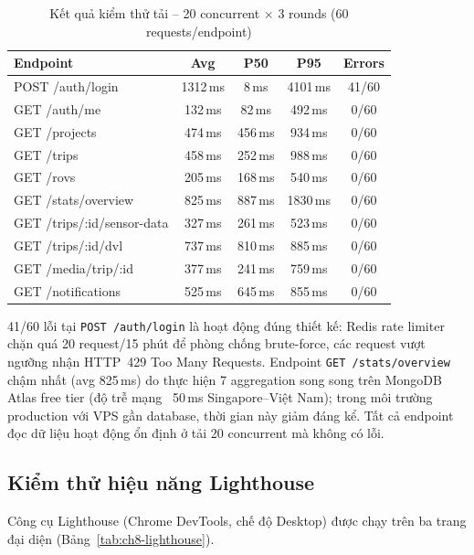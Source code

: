 \documentclass[../DoAn.tex]{subfiles}
\begin{document}
\begin{table}[H]
\centering
\caption{Kết quả kiểm thử tải -- 20 concurrent $\times$ 3 rounds (60 requests/endpoint)}
\label{tab:ch8-loadtest}
\small
\begin{tabular}{|p{5.0cm}|c|c|c|c|}
\hline
\textbf{Endpoint} & \textbf{Avg} & \textbf{P50} & \textbf{P95} & \textbf{Errors} \\
\hline
POST /auth/login & 1312\,ms & 8\,ms & 4101\,ms & 41/60 \\
\hline
GET /auth/me & 132\,ms & 82\,ms & 492\,ms & 0/60 \\
\hline
GET /projects & 474\,ms & 456\,ms & 934\,ms & 0/60 \\
\hline
GET /trips & 458\,ms & 252\,ms & 988\,ms & 0/60 \\
\hline
GET /rovs & 205\,ms & 168\,ms & 540\,ms & 0/60 \\
\hline
GET /stats/overview & 825\,ms & 887\,ms & 1830\,ms & 0/60 \\
\hline
GET /trips/:id/sensor-data & 327\,ms & 261\,ms & 523\,ms & 0/60 \\
\hline
GET /trips/:id/dvl & 737\,ms & 810\,ms & 885\,ms & 0/60 \\
\hline
GET /media/trip/:id & 377\,ms & 241\,ms & 759\,ms & 0/60 \\
\hline
GET /notifications & 525\,ms & 645\,ms & 855\,ms & 0/60 \\
\hline
\end{tabular}
\end{table}

41/60 lỗi tại \texttt{POST /auth/login} là hoạt động đúng thiết kế: Redis rate limiter chặn quá 20 request/15 phút để phòng chống brute-force, các request vượt ngưỡng nhận HTTP~429 Too Many Requests. Endpoint \texttt{GET /stats/overview} chậm nhất (avg 825\,ms) do thực hiện 7 aggregation song song trên MongoDB Atlas free tier (độ trễ mạng ~50\,ms Singapore--Việt Nam); trong môi trường production với VPS gần database, thời gian này giảm đáng kể. Tất cả endpoint đọc dữ liệu hoạt động ổn định ở tải 20 concurrent mà không có lỗi.

\subsection{Kiểm thử hiệu năng Lighthouse}

Công cụ Lighthouse (Chrome DevTools, chế độ Desktop) được chạy trên ba trang đại diện (Bảng~\ref{tab:ch8-lighthouse}).
\end{document}
